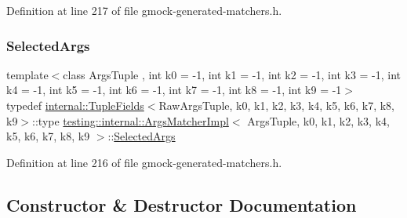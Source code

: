 Definition at line 217 of file gmock-\/generated-\/matchers.\+h.

\mbox{\label{classtesting_1_1internal_1_1ArgsMatcherImpl_ab061679f6251e56ccbedaf0c316d00ff}} 
\subsubsection{\texorpdfstring{Selected\+Args}{SelectedArgs}}
{\footnotesize\ttfamily template$<$class Args\+Tuple , int k0 = -\/1, int k1 = -\/1, int k2 = -\/1, int k3 = -\/1, int k4 = -\/1, int k5 = -\/1, int k6 = -\/1, int k7 = -\/1, int k8 = -\/1, int k9 = -\/1$>$ \\
typedef \hyperlink{classtesting_1_1internal_1_1TupleFields}{internal\+::\+Tuple\+Fields}$<$Raw\+Args\+Tuple, k0, k1, k2, k3, k4, k5, k6, k7, k8, k9$>$\+::type \hyperlink{classtesting_1_1internal_1_1ArgsMatcherImpl}{testing\+::internal\+::\+Args\+Matcher\+Impl}$<$ Args\+Tuple, k0, k1, k2, k3, k4, k5, k6, k7, k8, k9 $>$\+::\hyperlink{classtesting_1_1internal_1_1ArgsMatcherImpl_ab061679f6251e56ccbedaf0c316d00ff}{Selected\+Args}}



Definition at line 216 of file gmock-\/generated-\/matchers.\+h.



\subsection{Constructor \& Destructor Documentation}
\mbox{\label{classtesting_1_1internal_1_1ArgsMatcherImpl_a7f7a9a826d130d11fe30633d79f59a06}} 
